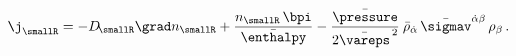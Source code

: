 \begin{equation} \label{eq:susyR}
   \j_{\smallR}= -D_{\!\smallR} \grad n_\smallR +
                   \frac{n_\smallR \,\bpi}{\bar\enthalpy}
		   -
                   \frac{\bar\pressure}{2\bar\vareps^{\, 2}} \>
		   \bar\rho_{\dot\alpha}
		   \,\bar\sigmav^{\dot\alpha \beta}\,
                   \rho_\beta \,.
\end{equation}

